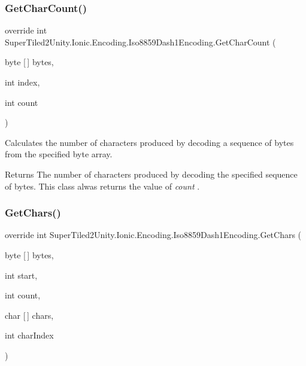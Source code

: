 \subsubsection{\texorpdfstring{Get\+Char\+Count()}{GetCharCount()}}
{\footnotesize\ttfamily override int Super\+Tiled2\+Unity.\+Ionic.\+Encoding.\+Iso8859\+Dash1\+Encoding.\+Get\+Char\+Count (\begin{DoxyParamCaption}\item[{byte \mbox{[}$\,$\mbox{]}}]{bytes,  }\item[{int}]{index,  }\item[{int}]{count }\end{DoxyParamCaption})}



Calculates the number of characters produced by decoding a sequence of bytes from the specified byte array. 

\begin{DoxyReturn}{Returns}
The number of characters produced by decoding the specified sequence of bytes. This class alwas returns the value of {\itshape count} . 
\end{DoxyReturn}
\mbox{\label{class_super_tiled2_unity_1_1_ionic_1_1_encoding_1_1_iso8859_dash1_encoding_a053cb2825528f45d36e5c2cdb4d32052}} 
\subsubsection{\texorpdfstring{Get\+Chars()}{GetChars()}}
{\footnotesize\ttfamily override int Super\+Tiled2\+Unity.\+Ionic.\+Encoding.\+Iso8859\+Dash1\+Encoding.\+Get\+Chars (\begin{DoxyParamCaption}\item[{byte \mbox{[}$\,$\mbox{]}}]{bytes,  }\item[{int}]{start,  }\item[{int}]{count,  }\item[{char \mbox{[}$\,$\mbox{]}}]{chars,  }\item[{int}]{char\+Index }\end{DoxyParamCaption})}



